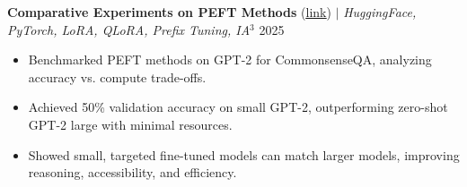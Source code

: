 \documentclass[letterpaper,11pt]{article}
\begin{document}
{%










{\textbf{Comparative Experiments on PEFT Methods} (\href{https://github.com/vishugp/Comparative_LLM_FineTuning}{\underline{link}}) $|$ \emph{HuggingFace, PyTorch, LoRA, QLoRA, Prefix Tuning, IA$^3$}} \hfill{2025}\vspace{-4pt}
\begin{itemize}[leftmargin=0.18in, itemsep=0px, parsep=0pt]
\item Benchmarked PEFT methods on GPT-2 for CommonsenseQA, analyzing accuracy vs. compute trade-offs.  
\item Achieved 50\% validation accuracy on small GPT-2, outperforming zero-shot GPT-2 large with minimal resources.
\item Showed small, targeted fine-tuned models can match larger models, improving reasoning, accessibility, and efficiency.  


\end{itemize}}
\end{document}
